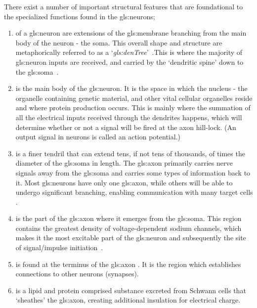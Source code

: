 \documentclass[class={myRUCProject}, crop=false]{standalone}
\begin{document}
There exist a number of important structural features that are foundational to the specialized functions found in the \glspl{gls:neuron};
\begin{enumerate}
    \item {} of a \gls{gls:neuron} are extensions of the \gls{gls:membrane} branching from the main body of the neuron - the soma. This overall shape and structure are metaphorically referred to as a `\textit{\gls{gls:denTree}}'\footnotemark~.This is where the majority of \gls{gls:neuron} inputs are received, and carried by the `dendritic spine' down to the \gls{gls:soma}~\cite{Hammond2015ch3,Hammond2015ch4}.
    \item {} is the main body of the \gls{gls:neuron}. It is the space in which the nucleus - the organelle containing genetic material, and other vital cellular organelles reside and where protein production occurs. This is mainly where the summation of all the electrical inputs received through the dendrites happens, which will determine whether or not a signal will be fired at the axon hill-lock. (An output signal in neurons is called an action potential.)  %
    \item {} is a finer tendril that can extend tens, if not tens of thousands, of times the diameter of the \gls{gls:soma} in length. The \gls{gls:axon} primarily carries nerve signals away from the \gls{gls:soma} and carries some types of information back to it. Most \glspl{gls:neuron} have only one \gls{gls:axon}, while others will be able to undergo significant branching, enabling communication with many target cells \cite{Hammond2015ch3,Hammond2015ch4}. 
    \item {} is the part of the \gls{gls:axon} where it emerges from the \gls{gls:soma}. This region contains the greatest density of voltage-dependent sodium channels, which makes it the most excitable part of the \gls{gls:neuron} and subsequently the site of signal/impulse initiation~\cite{Hammond2015ch3,Hammond2015ch4}. 
    \item {} is found at the terminus of the \gls{gls:axon} \cite{Hammond2015ch3,Hammond2015ch4}. It is the region which establishes connections to other neurons (synapses).
    \item {} is a lipid and protein comprised substance excreted from Schwann cells that `sheathes' the \gls{gls:axon}, creating additional insulation for %
electrical charge\cite{Hammond2015ch4}.
\end{enumerate}
\end{document}
